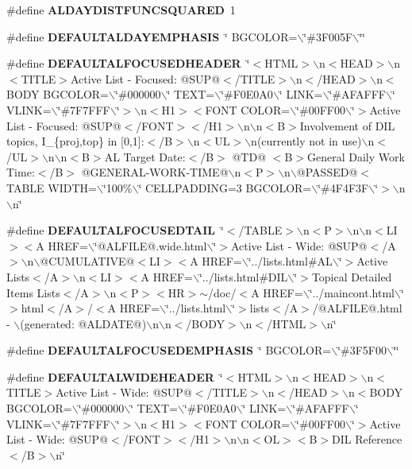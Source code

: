\begin{CompactItemize}
\#define {\bf ALDAYDISTFUNCSQUARED}\ 1
\item 
\#define {\bf DEFAULTALDAYEMPHASIS}\ \char`\"{} BGCOLOR=$\backslash$\char`\"{}\#3F005F$\backslash$\char`\"{}\char`\"{}
\item 
\#define {\bf DEFAULTALFOCUSEDHEADER}\ \char`\"{}$<$HTML$>$$\backslash$n$<$HEAD$>$$\backslash$n$<$TITLE$>$Active List - Focused: @SUP@$<$/TITLE$>$$\backslash$n$<$/HEAD$>$$\backslash$n$<$BODY BGCOLOR=$\backslash$\char`\"{}\#000000$\backslash$\char`\"{} TEXT=$\backslash$\char`\"{}\#F0E0A0$\backslash$\char`\"{} LINK=$\backslash$\char`\"{}\#AFAFFF$\backslash$\char`\"{} VLINK=$\backslash$\char`\"{}\#7F7FFF$\backslash$\char`\"{}$>$$\backslash$n$<$H1$>$$<$FONT COLOR=$\backslash$\char`\"{}\#00FF00$\backslash$\char`\"{}$>$Active List - Focused: @SUP@$<$/FONT$>$$<$/H1$>$$\backslash$n$\backslash$n$<$B$>$Involvement of DIL topics, I\_\-\{proj,top\} in [0,1]:$<$/B$>$$\backslash$n$<$UL$>$$\backslash$n(currently not in use)$\backslash$n$<$/UL$>$$\backslash$n$\backslash$n$<$B$>$AL Target Date:$<$/B$>$ @TD@ $<$B$>$General Daily Work Time:$<$/B$>$ @GENERAL-WORK-TIME@$\backslash$n$<$P$>$$\backslash$n$\backslash$@PASSED@$<$TABLE WIDTH=$\backslash$\char`\"{}100\%$\backslash$\char`\"{} CELLPADDING=3 BGCOLOR=$\backslash$\char`\"{}\#4F4F3F$\backslash$\char`\"{}$>$$\backslash$n$\backslash$n\char`\"{}
\item 
\#define {\bf DEFAULTALFOCUSEDTAIL}\ \char`\"{}$<$/TABLE$>$$\backslash$n$<$P$>$$\backslash$n$\backslash$n$<$LI$>$$<$A HREF=$\backslash$\char`\"{}@ALFILE@.wide.html$\backslash$\char`\"{}$>$Active List - Wide: @SUP@$<$/A$>$$\backslash$n$\backslash$@CUMULATIVE@$<$LI$>$$<$A HREF=$\backslash$\char`\"{}../lists.html\#AL$\backslash$\char`\"{}$>$Active Lists$<$/A$>$$\backslash$n$<$LI$>$$<$A HREF=$\backslash$\char`\"{}../lists.html\#DIL$\backslash$\char`\"{}$>$Topical Detailed Items Lists$<$/A$>$$\backslash$n$<$P$>$$<$HR$>$$\sim$/doc/$<$A HREF=$\backslash$\char`\"{}../maincont.html$\backslash$\char`\"{}$>$html$<$/A$>$/$<$A HREF=$\backslash$\char`\"{}../lists.html$\backslash$\char`\"{}$>$lists$<$/A$>$/@ALFILE@.html - $\backslash$(generated: @ALDATE@)$\backslash$n$\backslash$n$<$/BODY$>$$\backslash$n$<$/HTML$>$$\backslash$n\char`\"{}
\item 
\#define {\bf DEFAULTALFOCUSEDEMPHASIS}\ \char`\"{} BGCOLOR=$\backslash$\char`\"{}\#3F5F00$\backslash$\char`\"{}\char`\"{}
\item 
\#define {\bf DEFAULTALWIDEHEADER}\ \char`\"{}$<$HTML$>$$\backslash$n$<$HEAD$>$$\backslash$n$<$TITLE$>$Active List - Wide: @SUP@$<$/TITLE$>$$\backslash$n$<$/HEAD$>$$\backslash$n$<$BODY BGCOLOR=$\backslash$\char`\"{}\#000000$\backslash$\char`\"{} TEXT=$\backslash$\char`\"{}\#F0E0A0$\backslash$\char`\"{} LINK=$\backslash$\char`\"{}\#AFAFFF$\backslash$\char`\"{} VLINK=$\backslash$\char`\"{}\#7F7FFF$\backslash$\char`\"{}$>$$\backslash$n$<$H1$>$$<$FONT COLOR=$\backslash$\char`\"{}\#00FF00$\backslash$\char`\"{}$>$Active List - Wide: @SUP@$<$/FONT$>$$<$/H1$>$$\backslash$n$\backslash$n$<$OL$>$$<$B$>$DIL Reference$<$/B$>$$\backslash$n\char`\"{}
$$
\end{CompactItemize}
